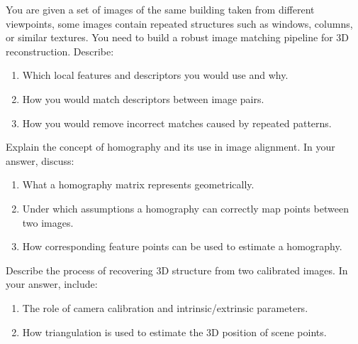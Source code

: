 \documentclass[12pt]{article}
\begin{document}
    \begin{ejercicio}[8 points]
        You are given a set of images of the same building taken from different viewpoints, some images contain repeated structures such as windows, columns, or similar textures. You need to build a robust image matching pipeline for 3D reconstruction. Describe:
        \begin{enumerate}
            \item[a)] Which local features and descriptors you would use and why.
            \item[b)] How you would match descriptors between image pairs.
            \item[c)] How you would remove incorrect matches caused by repeated patterns.
        \end{enumerate}
    \end{ejercicio}

    \begin{ejercicio}[8 points]
        Explain the concept of homography and its use in image alignment. In your answer, discuss:
        \begin{enumerate}
            \item[a)] What a homography matrix represents geometrically.
            \item[b)] Under which assumptions a homography can correctly map points between two images.
            \item[c)] How corresponding feature points can be used to estimate a homography.
        \end{enumerate}
    \end{ejercicio}

    \begin{ejercicio}[8 points]
        Describe the process of recovering 3D structure from two calibrated images. In your answer, include:
        \begin{enumerate}
            \item[a)] The role of camera calibration and intrinsic/extrinsic parameters.
            \item[b)] How triangulation is used to estimate the 3D position of scene points.
        \end{enumerate}
    \end{ejercicio}
\end{document}
